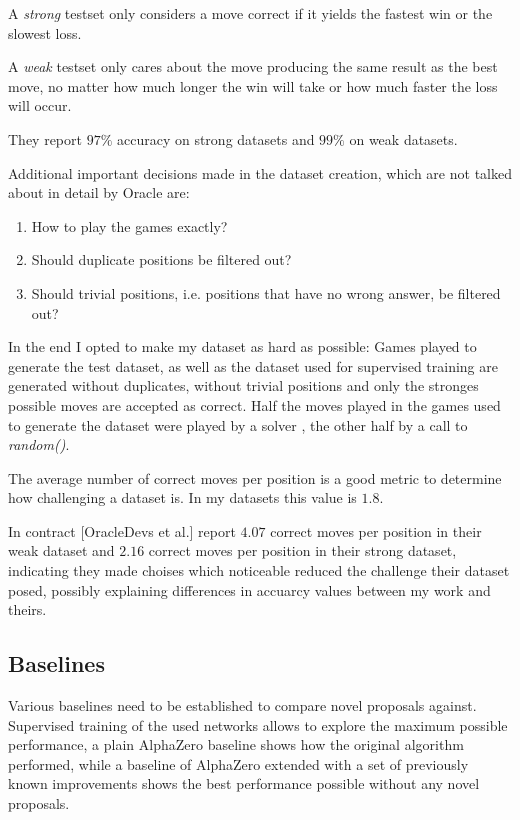 \documentclass[12pt,onecolumn,oneside,titlepage]{article}
\begin{document}
A \emph{strong} testset only considers a move correct if it yields the fastest win or the slowest loss. 

A \emph{weak} testset only cares about the move producing the same result 
as the best move, no matter how much longer the win will take or how much faster the loss will occur.

They report $97\%$ accuracy on strong datasets and $99\%$ on weak datasets.

Additional important decisions made in the dataset creation, which are not talked about in detail by Oracle are:

\begin{enumerate}
 \item How to play the games exactly?
 \item Should duplicate positions be filtered out?
 \item Should trivial positions, i.e. positions that have no wrong answer, be filtered out?
\end{enumerate}

In the end I opted to make my dataset as hard as possible: Games played to generate the test dataset, as well as the dataset used for supervised training are generated without duplicates, without trivial positions and only the stronges possible moves are accepted as correct.
Half the moves played in the games used to generate the dataset were played by a solver \cite{pascalsolver, pascalsolvergithub}, the other half by a call to \emph{random()}.

The average number of correct moves per position is a good metric to determine how challenging a dataset is. In my datasets this value is $1.8$.

In contract \cite{oracledevs}[OracleDevs et al.] report $4.07$ correct moves per position in their weak dataset and $2.16$ correct moves per position in their strong dataset, indicating they made choises which noticeable reduced the challenge their dataset posed, 
possibly explaining differences in accuarcy values between my work and theirs.


\subsection{Baselines}

Various baselines need to be established to compare novel proposals against. Supervised training of the used networks allows to explore the maximum possible performance, a plain AlphaZero baseline shows how the original algorithm performed, while a baseline
of AlphaZero extended with a set of previously known improvements shows the best performance possible without any novel proposals.
\end{document}
